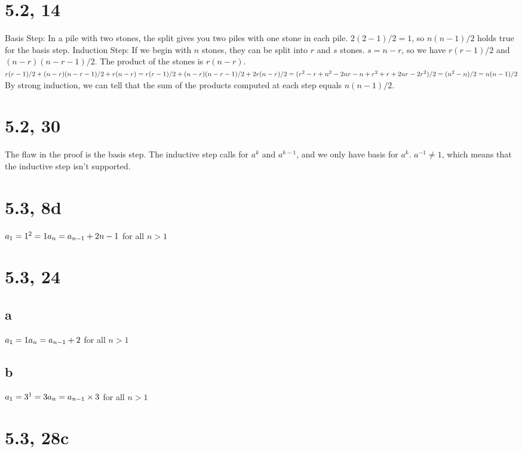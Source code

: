 \documentclass{article}
\begin{document}
\section{5.2, 14}
Basis Step: In a pile with two stones, the split gives you two piles with one stone in each pile. $2(2-1)/2 = 1$, so $n(n-1)/2$ holds true for the basis step.
\newline
Induction Step:
\newline
If we begin with $n$ stones, they can be split into $r$ and $s$ stones. $s = n - r$, so we have $r(r - 1)/2$ and $(n - r)(n - r - 1)/2$. The product of the stones is $r(n - r)$.
\newline
$r(r - 1)/2 + (n - r)(n - r - 1)/2 + r(n - r)
\newline
= r(r - 1)/2 + (n - r)(n - r - 1)/2 + 2r(n - r)/2
\newline
= (r^2 - r + n^2 - 2nr - n + r^2 + r + 2nr - 2r^2)/2
\newline
= (n^2 - n)/2
\newline
= n(n - 1)/2$
\newline
By strong induction, we can tell that the sum of the products computed at each step equals $n(n - 1)/2$.

\section{5.2, 30}
The flaw in the proof is the basis step. The inductive step calls for $a^{k}$ and $a^{k - 1}$, and we only have basis for $a^{k}$. $a^{-1} \neq 1$, which means that the inductive step isn't supported.

\section{5.3, 8d}
$a_{1} = 1^2 = 1
\newline
a_{n} = a_{n - 1} + 2n - 1$ for all $n > 1$

\section{5.3, 24}
\subsection{a}
$a_{1} = 1
\newline
a_{n} = a_{n - 1} + 2$ for all $n > 1$
\subsection{b}
$a_{1} = 3^1 = 3
\newline
a_{n} = a_{n - 1} \times 3$ for all $n > 1$

\section{5.3, 28c}
\end{document}

